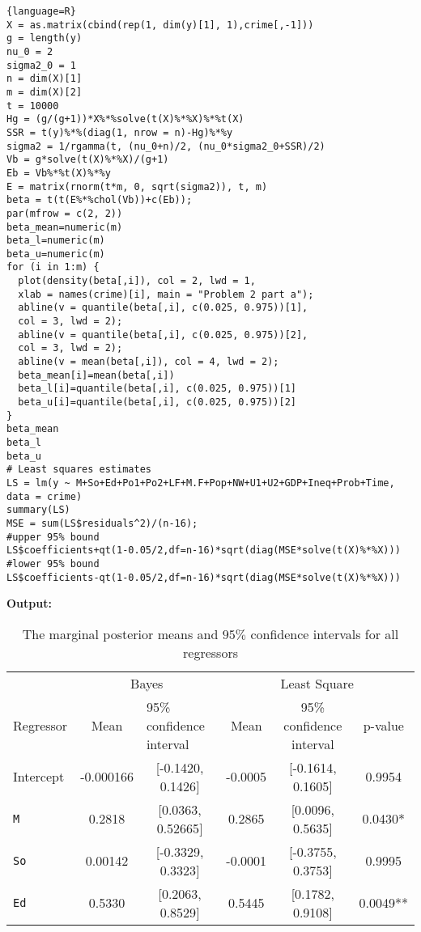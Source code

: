 \documentclass[12pt]{article}
\newenvironment{problem}[2][Problem]{\begin{trivlist}
\item[\hskip \labelsep {\bfseries #1}\hskip \labelsep {\bfseries #2.}]}{\end{trivlist}}
\begin{document}
\begin{problem}{2}
\begin{lstlisting}{language=R}
X = as.matrix(cbind(rep(1, dim(y)[1], 1),crime[,-1]))
g = length(y)
nu_0 = 2
sigma2_0 = 1
n = dim(X)[1]
m = dim(X)[2]
t = 10000
Hg = (g/(g+1))*X%*%solve(t(X)%*%X)%*%t(X)
SSR = t(y)%*%(diag(1, nrow = n)-Hg)%*%y
sigma2 = 1/rgamma(t, (nu_0+n)/2, (nu_0*sigma2_0+SSR)/2)
Vb = g*solve(t(X)%*%X)/(g+1)
Eb = Vb%*%t(X)%*%y
E = matrix(rnorm(t*m, 0, sqrt(sigma2)), t, m)
beta = t(t(E%*%chol(Vb))+c(Eb));
par(mfrow = c(2, 2))
beta_mean=numeric(m)
beta_l=numeric(m)
beta_u=numeric(m)
for (i in 1:m) {
  plot(density(beta[,i]), col = 2, lwd = 1, 
  xlab = names(crime)[i], main = "Problem 2 part a");
  abline(v = quantile(beta[,i], c(0.025, 0.975))[1], 
  col = 3, lwd = 2);
  abline(v = quantile(beta[,i], c(0.025, 0.975))[2], 
  col = 3, lwd = 2);
  abline(v = mean(beta[,i]), col = 4, lwd = 2);
  beta_mean[i]=mean(beta[,i])
  beta_l[i]=quantile(beta[,i], c(0.025, 0.975))[1]
  beta_u[i]=quantile(beta[,i], c(0.025, 0.975))[2]
}
beta_mean
beta_l
beta_u
# Least squares estimates
LS = lm(y ~ M+So+Ed+Po1+Po2+LF+M.F+Pop+NW+U1+U2+GDP+Ineq+Prob+Time, 
data = crime)
summary(LS)
MSE = sum(LS$residuals^2)/(n-16);
#upper 95% bound
LS$coefficients+qt(1-0.05/2,df=n-16)*sqrt(diag(MSE*solve(t(X)%*%X)))
#lower 95% bound
LS$coefficients-qt(1-0.05/2,df=n-16)*sqrt(diag(MSE*solve(t(X)%*%X)))
\end{lstlisting} 
\textbf{Output:}
\begin{table}[h]
\centering
\caption{The marginal posterior means and $95\%$ confidence intervals for all regressors}
\label{Table 3}
\begin{tabular}{lcc|ccc}
                                 & \multicolumn{2}{c|}{Bayes}                              & \multicolumn{3}{c}{Least Square}              \\ \cline{2-6} 
\multicolumn{1}{l|}{Regressor}   & Mean    & \multicolumn{1}{l|}{95\% confidence interval} & Mean    & 95\% confidence interval & p-value  \\ \hline
\multicolumn{1}{l|}{Intercept} & -0.000166  & {[}-0.1420, 0.1426{]}                         & -0.0005 & {[}-0.1614, 0.1605{]}    & 0.9954   \\
\multicolumn{1}{l|}{\texttt{M}}           & 0.2818  & {[}0.0363, 0.52665{]}                          & 0.2865  & {[}0.0096, 0.5635{]}     & 0.0430*  \\
\multicolumn{1}{l|}{\texttt{So}}          & 0.00142  & {[}-0.3329, 0.3323{]}                         & -0.0001 & {[}-0.3755, 0.3753{]}    & 0.9995   \\
\multicolumn{1}{l|}{\texttt{Ed}}          & 0.5330  & {[}0.2063, 0.8529{]}                          & 0.5445  & {[}0.1782, 0.9108{]}     & 0.0049** \\

\end{tabular}
\end{table}
\end{problem}
\end{document}
